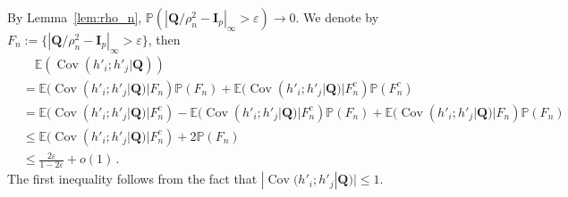 \documentclass[11pt]{article}
\DeclareMathOperator{\Cov}{Cov}
\newcommand{\bI}{\boldsymbol{I}}
\newcommand{\bQ}{\boldsymbol{Q}}
\newcommand{\Expected}{\mathbb{E}}
\newcommand{\Prob}{\mathbb{P}}
\begin{document}
By Lemma~\ref{lem:rho_n}, $\Prob(|\bQ/\rho_n^2-\bI_p|_\infty > \varepsilon)\to 0$. We denote by $F_n:=\{|\bQ/\rho_n^2-\bI_p|_\infty > \varepsilon\}$, then
\begin{align}\label{eq:total-cov-1}
    &\quad\Expected(\Cov(h'_i;h'_j|\bQ))\nonumber \\
    &= \Expected(\Cov(h'_i;h'_j|\bQ)|F_n)\Prob(F_n) + \Expected(\Cov(h'_i;h'_j|\bQ)|F_n^c)\Prob(F_n^c)\nonumber\\
    &=  \Expected(\Cov(h'_i;h'_j|\bQ)|F_n^c)-\Expected(\Cov(h'_i;h'_j|\bQ)|F_n^c)\Prob(F_n)+ \Expected(\Cov(h'_i;h'_j|\bQ)|F_n)\Prob(F_n)\nonumber\\
    &\le  \Expected(\Cov(h'_i;h'_j|\bQ)|F_n^c) + 2\Prob(F_n)\nonumber\\
    &\le  \frac{2\varepsilon}{1-2\varepsilon} + o(1)\,.
\end{align}
The first inequality follows from the fact that $|\Cov(h'_i;h'_j|\bQ)|\le 1$. 
\end{document}
